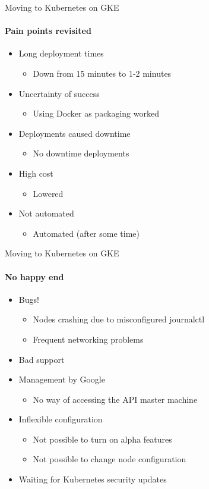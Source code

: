 \documentclass[17pt]{beamer}
\begin{document}
  \begin{frame}{Moving to Kubernetes on GKE}
  \framesubtitle{Pain points revisited}
  \begin{itemize}
    \item<1-> Long deployment times
    \begin{itemize}
      \item Down from 15 minutes to 1-2 minutes
    \end{itemize}
    \item<2-> Uncertainty of success
    \begin{itemize}
      \item Using Docker as packaging worked
    \end{itemize}
    \item<3-> Deployments caused downtime
    \begin{itemize}
      \item No downtime deployments
    \end{itemize}
    \item<4-> High cost
    \begin{itemize}
      \item Lowered
    \end{itemize}
    \item<5-> Not automated
    \begin{itemize}
      \item Automated (after some time)
    \end{itemize}
  \end{itemize}
  \end{frame}

  \begin{frame}{Moving to Kubernetes on GKE}
  \framesubtitle{No happy end}
  \begin{itemize}
    \item Bugs!
    \begin{itemize}
      \item Nodes crashing due to misconfigured journalctl
      \item Frequent networking problems
    \end{itemize}
    \item Bad support
    \item Management by Google
    \begin{itemize}
      \item No way of accessing the API master machine
    \end{itemize}
    \item Inflexible configuration
    \begin{itemize}
      \item Not possible to turn on alpha features
      \item Not possible to change node configuration
    \end{itemize}
  \item Waiting for Kubernetes security updates
  \end{itemize}
  \end{frame}
\end{document}

